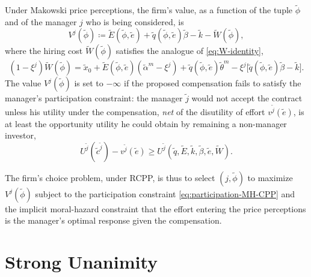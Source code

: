\documentclass[11pt,a4paper,oneside]{book}
\def\geq{\geqslant}
\theoremstyle{plain}
\theoremstyle{definition}
\theoremstyle{remark}
\numberwithin{equation}{chapter}
\begin{document}
Under Makowski price perceptions, the firm's value, as a function of the tuple $\widetilde{\phi}$ and of the manager $j$ who is being considered, is
\begin{equation}\label{eq:firm-value-MH-CPP}
  V^j(\widetilde{\phi})
  \coloneqq \widetilde{E}(\widetilde{\phi}, \widetilde{e}) + \widetilde{q}(\widetilde{\phi}, \widetilde{e}) \widetilde{\beta} - \widetilde{k} - \widetilde{W}(\widetilde{\phi}),
\end{equation}
where the hiring cost $\widetilde{W}(\widetilde{\phi})$ satisfies the analogue of \eqref{eq:W-identity},
\begin{equation}\label{eq:W-identity-tilde}
  (1 - \xi^j) \widetilde{W}(\widetilde{\phi})
  = \widetilde{x}_0 + \widetilde{E}(\widetilde{\phi}, \widetilde{e}) (\widetilde{\alpha}^m - \xi^j) + \widetilde{q}(\widetilde{\phi}, \widetilde{e}) \widetilde{\theta}^m
  - \xi^j \bigl[ \widetilde{q}(\widetilde{\phi}, \widetilde{e}) \widetilde{\beta} - \widetilde{k} \bigr].
\end{equation}
The value $V^j(\widetilde{\phi})$ is set to $-\infty$ if the proposed compensation fails to satisfy the manager's participation constraint: the manager $\widetilde{j}$ would not accept the contract unless his utility under the compensation, \emph{net} of the disutility of effort $v^{\widetilde{j}}(\widetilde{e})$, is at least the opportunity utility he could obtain by remaining a non-manager investor,
\begin{equation}\label{eq:participation-MH-CPP}
  U^{\widetilde{j}}(\widetilde{c}^{\widetilde{j}}) - v^{\widetilde{j}}(\widetilde{e})
  \geq
  U^{\widetilde{j}}(\widetilde{q}, \widetilde{E}, \widetilde{k}, \widetilde{\beta}, \widetilde{e}, \widetilde{W}).
\end{equation}

The firm's choice problem, under RCPP, is thus to select $(j, \widetilde{\phi})$ to maximize $V^j(\widetilde{\phi})$ subject to the participation constraint \eqref{eq:participation-MH-CPP} and the implicit moral-hazard constraint that the effort entering the price perceptions is the manager's optimal response given the compensation.

\section{Strong Unanimity}
\label{sec:MH-CPP-unanimity}
\end{document}
